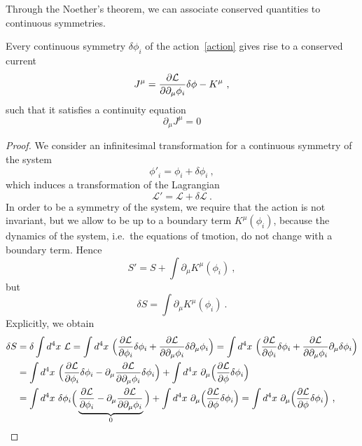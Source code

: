     Through the Noether's theorem, we can associate conserved quantities to continuous symmetries.

    \begin{theorem}[Noether's]
        Every continuous symmetry $\delta \phi_i$ of the action~\eqref{action} gives rise to a conserved current 
        \begin{equation}\label{conscurr}
            J^\mu = \frac{\partial\mathcal L}{\partial\partial_\mu \phi_i} \delta \phi - K^\mu ~,
        \end{equation}
        such that it satisfies a continuity equation 
        \begin{equation}\label{cont}
            \partial_\mu J^\mu = 0
        \end{equation}
    \end{theorem}
    \begin{proof}
        We consider an infinitesimal transformation for a continuous symmetry of the system
        \begin{equation*}
            {\phi'}_i = \phi_i + \delta \phi_i ~,
        \end{equation*}
        which induces a transformation of the Lagrangian 
        \begin{equation*}
            \mathcal L' = \mathcal L + \delta \mathcal L ~.
        \end{equation*}
        In order to be a symmetry of the system, we require that the action is not invariant, but we allow to be up to a boundary term $K^\mu(\phi_i)$, because the dynamics of the system, i.e.~the equations of tmotion, do not change with a boundary term. Hence 
        \begin{equation*}
            S' = S + \int \partial_\mu K^\mu(\phi_i) ~,
        \end{equation*}
        but 
        \begin{equation}\label{symm}
            \delta S = \int \partial_\mu K^\mu(\phi_i) ~.
        \end{equation}
        Explicitly, we obtain 
        \begin{equation*}
        \begin{aligned}
            \delta S & = \delta \int d^4 x ~ \mathcal L = \int d^4 x ~ \Big ( \pdv{\mathcal L}{\phi_i} \delta \phi_i + \pdv{\mathcal L}{\partial_\mu \phi_i} \delta \partial_\mu \phi_i\Big) =  \int d^4 x ~ \Big ( \pdv{\mathcal L}{\phi_i} \delta \phi_i + \pdv{\mathcal L}{\partial_\mu \phi_i} \partial_\mu \delta \phi_i \Big) \\ & =  \int d^4 x ~ \Big ( \pdv{\mathcal L}{\phi_i} \delta \phi_i - \partial_\mu \pdv{\mathcal L}{\partial_\mu \phi_i} \delta \phi_i \Big) + \int d^4 x ~ \partial_\mu \Big ( \pdv{\mathcal L}{\phi} \delta \phi_i \Big)\\ & =  \int d^4 x ~ \delta \phi_i \Big ( \underbrace{\pdv{\mathcal L}{\phi_i} - \partial_\mu \pdv{\mathcal L}{\partial_\mu \phi_i}}_0 \Big) + \int d^4 x ~ \partial_\mu \Big ( \pdv{\mathcal L}{\phi} \delta \phi_i \Big)  = \int d^4 x ~ \partial_\mu \Big ( \pdv{\mathcal L}{\phi} \delta \phi_i \Big) ~,

\end{aligned}
\end{equation*}
\end{proof}
